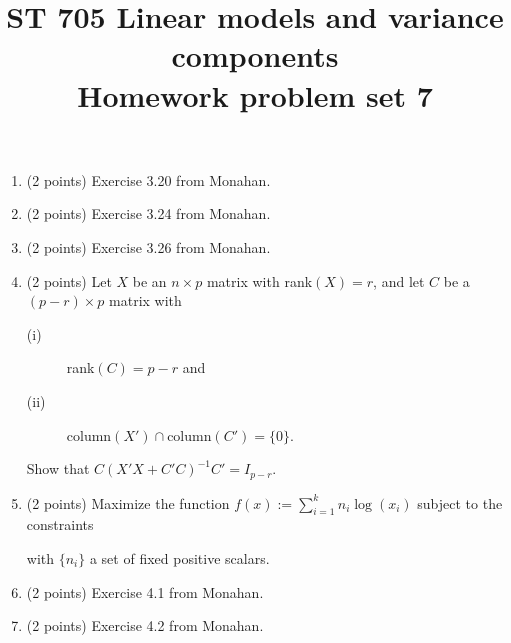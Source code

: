 \documentclass[11pt]{article}
\title{ST 705 Linear models and variance components \\ 
        Homework problem set 7}
\begin{document}
\maketitle

\begin{enumerate}

\item(2 points) Exercise 3.20 from Monahan.

\item(2 points) Exercise 3.24 from Monahan.

\item(2 points) Exercise 3.26 from Monahan.

\item(2 points)  Let $X$ be an $n\times p$ matrix with rank$(X) = r$, and let $C$ be a $(p-r)\times p$ matrix with 
\begin{description}
\item[(i)] rank$(C) = p-r$ and
\item[(ii)] $\text{column}(X') \cap \text{column}(C') = \{0\}$.
\end{description}
Show that $C(X'X + C'C)^{-1}C' = I_{p-r}$.

\item(2 points) Maximize the function $f(x) := \sum_{i=1}^{k}n_{i}\log(x_{i})$ subject to the constraints
with $\{n_{i}\}$ a set of fixed positive scalars.

\item(2 points) Exercise 4.1 from Monahan.

\item(2 points) Exercise 4.2 from Monahan.

\end{enumerate}
\end{document}
